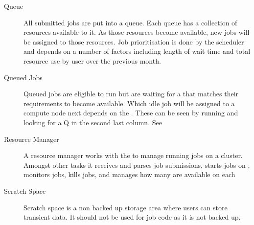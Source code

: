 \documentclass[letterpaper,10pt,english]{sphinxmanual}
\begin{document}
\begin{description}
\item[{Queue\label{\detokenize{glossary:term-Queue}}}] \leavevmode
All submitted jobs are put into a queue. Each queue has a collection of resources available to it. As those resources become available, new jobs will be assigned to those resources. Job prioritisation is done by the scheduler and depends on a number of factors including length of wait time and total resource use by user over the previous month.

\item[{Queued Jobs\label{\detokenize{glossary:term-Queued-Jobs}}}] \leavevmode
Queued jobs are eligible to run but are waiting for a {\hyperref[\detokenize{glossary:term-Compute-Nodes}]{}} that matches their requirements to become available. Which idle job will be assigned to a compute node next depends on the {\hyperref[\detokenize{glossary:term-Job-Scheduler}]{}}. These can be seen by running  and looking for a Q in the second last column. See {\hyperref[\detokenize{using_katana/running_jobs:more-info-from-pbs}]{}}

\item[{Resource Manager\label{\detokenize{glossary:term-Resource-Manager}}}] \leavevmode
A resource manager works with the {\hyperref[\detokenize{glossary:term-Job-Scheduler}]{}} to manage running jobs on a cluster. Amongst other tasks it receives and parses job submissions, starts jobs on {\hyperref[\detokenize{glossary:term-Compute-Nodes}]{}}, monitors jobs, kills jobs, and manages how many {\hyperref[\detokenize{glossary:term-CPU-Core}]{}} are available on each {\hyperref[\detokenize{glossary:term-Compute-Nodes}]{}}

\item[{Scratch Space\label{\detokenize{glossary:term-Scratch-Space}}}] \leavevmode
Scratch space is a non backed up storage area where users can store transient data. It should not be used for job code as it is not backed up.


\end{description}
\end{document}
